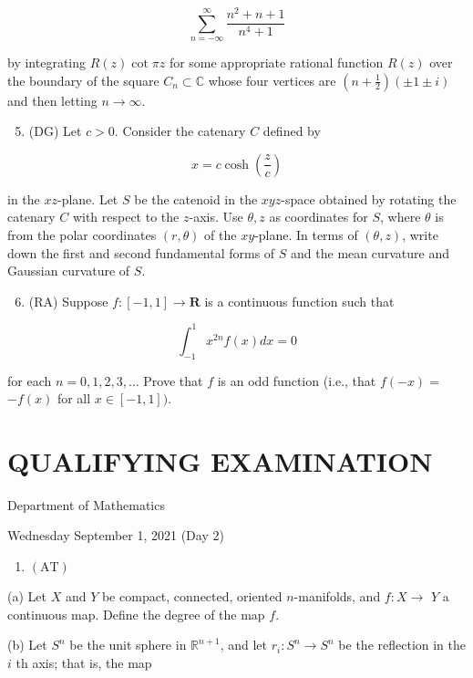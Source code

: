 \documentclass[10pt]{article}
\begin{document}
$$
\sum_{n=-\infty}^{\infty} \frac{n^{2}+n+1}{n^{4}+1}
$$

by integrating $R(z) \cot \pi z$ for some appropriate rational function $R(z)$ over the boundary of the square $C_{n} \subset \mathbb{C}$ whose four vertices are $\left(n+\frac{1}{2}\right)( \pm 1 \pm i)$ and then letting $n \rightarrow \infty$.

\begin{enumerate}
  \setcounter{enumi}{4}
  \item (DG) Let $c>0$. Consider the catenary $C$ defined by
\end{enumerate}

$$
x=c \cosh \left(\frac{z}{c}\right)
$$

in the $x z$-plane. Let $S$ be the catenoid in the $x y z$-space obtained by rotating the catenary $C$ with respect to the $z$-axis. Use $\theta, z$ as coordinates for $S$, where $\theta$ is from the polar coordinates $(r, \theta)$ of the $x y$-plane. In terms of $(\theta, z)$, write down the first and second fundamental forms of $S$ and the mean curvature and Gaussian curvature of $S$.

\begin{enumerate}
  \setcounter{enumi}{5}
  \item (RA) Suppose $f:[-1,1] \rightarrow \mathbf{R}$ is a continuous function such that
\end{enumerate}

$$
\int_{-1}^{1} x^{2 n} f(x) d x=0
$$

for each $n=0,1,2,3, \ldots$ Prove that $f$ is an odd function (i.e., that $f(-x)=$ $-f(x)$ for all $x \in[-1,1])$.

\section*{QUALIFYING EXAMINATION }
Department of Mathematics

Wednesday September 1, 2021 (Day 2)

\begin{enumerate}
  \item $(\mathrm{AT})$
\end{enumerate}

(a) Let $X$ and $Y$ be compact, connected, oriented $n$-manifolds, and $f: X \rightarrow$ $Y$ a continuous map. Define the degree of the map $f$.

(b) Let $S^{n}$ be the unit sphere in $\mathbb{R}^{n+1}$, and let $r_{i}: S^{n} \rightarrow S^{n}$ be the reflection in the $i$ th axis; that is, the map
\end{document}
